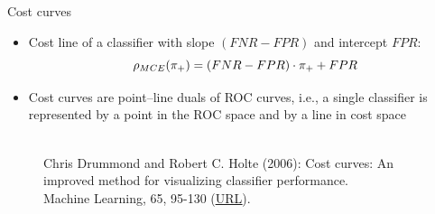 \documentclass[11pt,compress,t,notes=noshow, xcolor=table]{beamer}
\begin{document}

\begin{vbframe}{Cost curves}

\begin{footnotesize}

\begin{itemize}
  \item Cost line of a classifier with slope $(FNR - FPR)$ and intercept $FPR$: $$\rho_{MCE}(\pi_{+}) = (FNR - FPR) \cdot \pi_{+} + FPR$$
  \item Cost curves are point–line duals of ROC curves, i.e., a single classifier is represented by a point in the ROC space and by a line in cost space
\end{itemize}

\end{footnotesize}

\begin{figure}
  \centering
  \tiny
  \\Chris Drummond and Robert C. Holte (2006): Cost curves: An improved
  method for visualizing classifier performance. \\Machine Learning, 65, 95-130
  (\href{https://www.semanticscholar.org/paper/Cost-curves\%3A-An-improved-method-for  -visualizing-Drummond-Holte/71708ce984e0896e7383435913547e770572410e}
  {\underline{URL}}).
\end{figure}


\end{vbframe}
\end{document}
